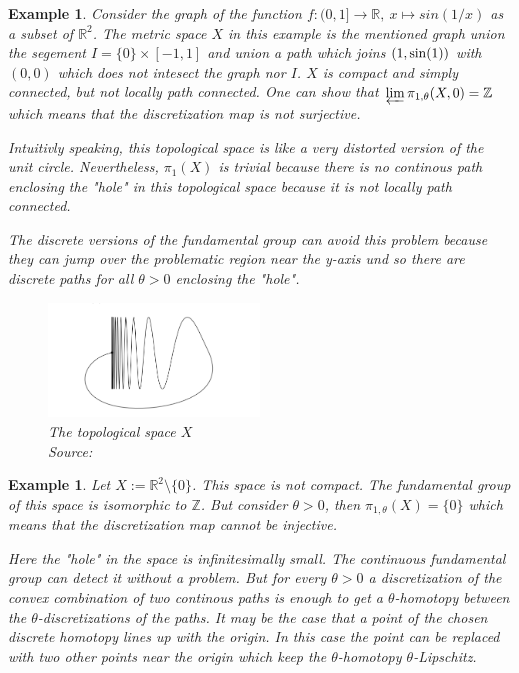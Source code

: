 \documentclass[a4paper, 11pt, twoside]{article}
\newcommand{\R}[0]{\mathbb{R}}
\theoremstyle{break}
\theoremstyle{break}
\newtheorem{ex}[thm]{Example}
\begin{document}
\begin{ex}
  Consider the graph of the function $f\colon (0, 1] \to \R, \: x \mapsto sin(1/x)$ as a subset of $\R^2$. 
  The metric space $X$ in this example is the mentioned graph union the segement $I = \{0\} \times [-1, 1]$ and union a path which joins $(1, {\rm sin}(1))$ with $(0, 0)$ 
  which does not intesect the graph nor $I$.
  $X$ is compact and simply connected, but not locally path connected.
  One can show that $\varprojlim \pi_{1,\theta}(X, 0) = \mathbb{Z}$ which means that the discretization map is not surjective.

  Intuitivly speaking, this topological space is like a very distorted version of the unit circle. 
  Nevertheless, $\pi_1(X)$ is trivial because there is no continous path enclosing the "hole" in this topological space because it is not locally path connected.
  
  The discrete versions of the fundamental group can avoid this problem because they can jump over the problematic region near the y-axis und so there are discrete paths for all 
  $\theta > 0$ enclosing the "hole".
  
  \begin{figure}[ht!]
    \centering
    \includegraphics[width=0.5\textwidth]{ex1.png}
    \caption{The topological space $X$ \\ Source: \cite[p. 8]{vigolo2018fundamental}}
  \end{figure}
\end{ex}

\begin{ex}
  Let $X := \R^2 \setminus \{0\}$. This space is not compact. The fundamental group of this space is isomorphic to $\mathbb{Z}$. 
  But consider $\theta > 0$, then $\pi_{1,\theta}(X) = \{0\}$ which means that the discretization map cannot be injective.

  Here the "hole" in the space is infinitesimally small. The continuous fundamental group can detect it without a problem. 
  But for every $\theta > 0$ a discretization of the convex combination of two continous paths is enough to get a $\theta$-homotopy between the 
  $\theta$-discretizations of the paths.
  It may be the case that a point of the chosen discrete homotopy lines up with the origin.
  In this case the point can be replaced with two other points near the origin which keep the $\theta$-homotopy $\theta$-Lipschitz.  
\end{ex}

\clearpage

\end{document}
